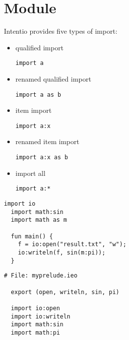 \chapter{Module}

Intentio provides five types of import:
\begin{itemize}
  \item qualified import
\begin{lstlisting}[language=intentio]
  import a
\end{lstlisting}
  \item renamed qualified import
\begin{lstlisting}[language=intentio]
  import a as b
\end{lstlisting}
  \item item import
\begin{lstlisting}[language=intentio]
  import a:x
\end{lstlisting}
  \item renamed item import
\begin{lstlisting}[language=intentio]
  import a:x as b
\end{lstlisting}
  \item import all
\begin{lstlisting}[language=intentio]
  import a:*
\end{lstlisting}
\end{itemize}

\clearpage
\begin{example}
\begin{lstlisting}[language=intentio]
  import io
  import math:sin
  import math as m
  
  fun main() {
    f = io:open("result.txt", "w");
    io:writeln(f, sin(m:pi));
  }
\end{lstlisting}
\end{example}

\begin{example}[Re-exporting]
  \begin{lstlisting}[language=intentio]
  # File: myprelude.ieo
  
  export (open, writeln, sin, pi)
  
  import io:open
  import io:writeln
  import math:sin
  import math:pi
  \end{lstlisting}
  \end{example}